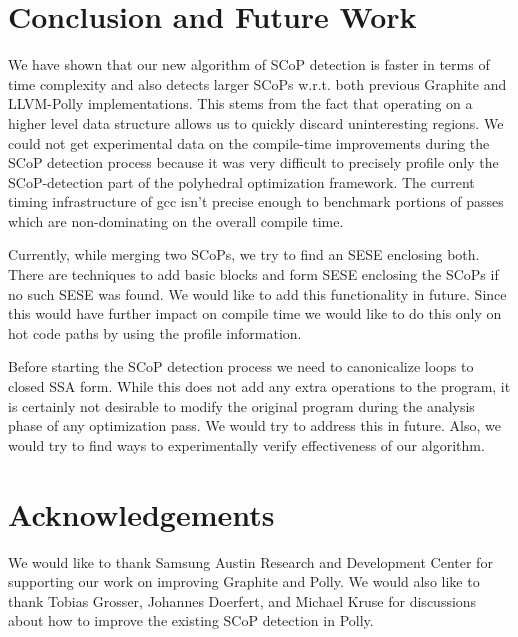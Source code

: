 \documentclass{sigplanconf}
\begin{document}
\section{Conclusion and Future Work}
We have shown that our new algorithm of SCoP detection is faster in terms of
time complexity and also detects larger SCoPs w.r.t. both previous Graphite and
LLVM-Polly implementations. This stems from the fact that operating on a higher
level data structure allows us to quickly discard uninteresting regions. We
could not get experimental data on the compile-time improvements during the SCoP
detection process because it was very difficult to precisely profile only the
SCoP-detection part of the polyhedral optimization framework. The current timing
infrastructure of gcc isn't precise enough to benchmark portions of passes which
are non-dominating on the overall compile time.

Currently, while merging two SCoPs, we try to find an SESE enclosing both. There
are techniques to add basic blocks and form SESE enclosing the SCoPs if no such
SESE was found. We would like to add this functionality in future. Since this
would have further impact on compile time we would like to do this only on hot
code paths by using the profile information.

Before starting the SCoP detection process we need to canonicalize loops to
closed SSA form. While this does not add any extra operations to the program, it
is certainly not desirable to modify the original program during the analysis
phase of any optimization pass. We would try to address this in future.  Also,
we would try to find ways to experimentally verify effectiveness of our
algorithm.

\section{Acknowledgements}
We would like to thank Samsung Austin Research and Development Center for
supporting our work on improving Graphite and Polly.  We would also like to
thank Tobias Grosser, Johannes Doerfert, and Michael Kruse for discussions about
how to improve the existing SCoP detection in Polly.


{\small

}
\end{document}
